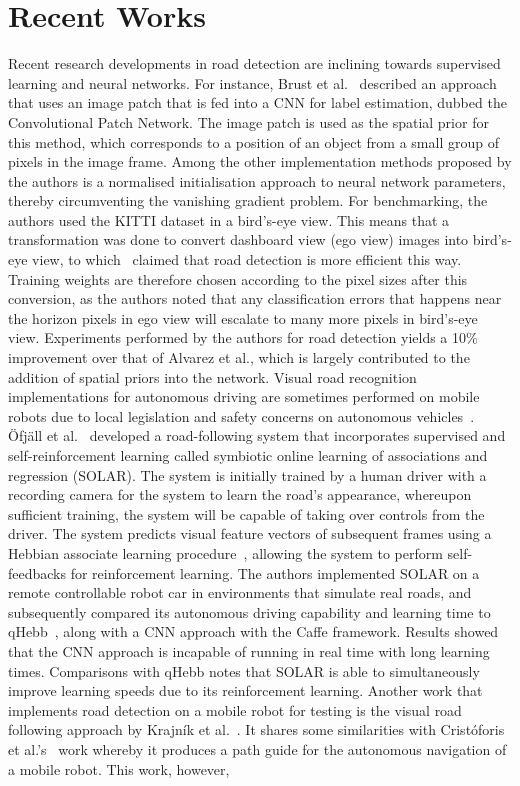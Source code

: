 \section{Recent Works} \label{secrecent}
Recent research developments in road detection are inclining towards supervised learning and neural networks. For instance, Brust et al.~\cite{brust_convolutional_2015} described an approach that uses an image patch that is fed into a CNN for label estimation, dubbed the Convolutional Patch Network. The image patch is used as the spatial prior for this method, which corresponds to a position of an object from a small group of pixels in the image frame. Among the other implementation methods proposed by the authors is a normalised initialisation approach to neural network parameters, thereby circumventing the vanishing gradient problem. For benchmarking, the authors used the KITTI dataset in a bird's-eye view. This means that a transformation was done to convert dashboard view (ego view) images into bird's-eye view, to which~\cite{jannik_fritsch_new_2013} claimed that road detection is more efficient this way. Training weights are therefore chosen according to the pixel sizes after this conversion, as the authors noted that any classification errors that happens near the horizon pixels in ego view will escalate to many more pixels in bird's-eye view. Experiments performed by the authors for road detection yields a 10\% improvement over that of Alvarez et al., which is largely contributed to the addition of spatial priors into the network. Visual road recognition implementations for autonomous driving are sometimes performed on mobile robots due to local legislation and safety concerns on autonomous vehicles~\cite{ofjall_visual_2016}. \"{O}fj\"{a}ll et al.~\cite{ofjall_visual_2016} developed a road-following system that incorporates supervised and self-reinforcement learning called symbiotic online learning of associations and regression (SOLAR). The system is initially trained by a human driver with a recording camera for the system to learn the road's appearance, whereupon sufficient training, the system will be capable of taking over controls from the driver. The system predicts visual feature vectors of subsequent frames using a Hebbian associate learning procedure~\cite{ofjall_biologically_2014}, allowing the system to perform self-feedbacks for reinforcement learning. The authors implemented SOLAR on a remote controllable robot car in environments that simulate real roads, and subsequently compared its autonomous driving capability and learning time to qHebb~\cite{ofjall_biologically_2014}, along with a CNN approach with the Caffe framework. Results showed that the CNN approach is incapable of running in real time with long learning times. Comparisons with qHebb notes that SOLAR is able to simultaneously improve learning speeds due to its reinforcement learning.  Another work that implements road detection on a mobile robot for testing is the visual road following approach by Krajn{\'i}k et al.~\cite{tomas_krajnik_visual_2015}. It shares some similarities with Crist\'{o}foris et al.'s~\cite{cristoforis_real-time_2016} work whereby it produces a path guide for the autonomous navigation of a mobile robot. This work, however, 